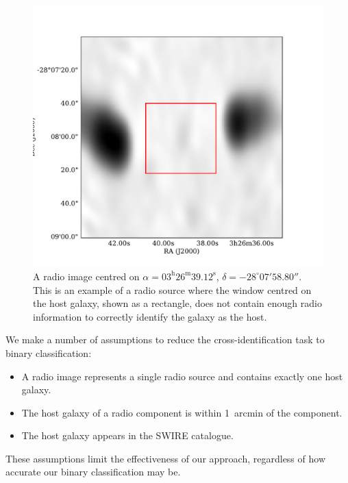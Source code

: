 \documentclass[fleqn,usenatbib,usedcolumn]{mnras}
\begin{document}
        \begin{figure}
      \centering
      \includegraphics[width=\linewidth]{images/CI2363_fig.pdf}
      \caption{A radio image centred on $\alpha =
        03^\text{h}26^\text{m}39.12^\text{s}$, $\delta = -28^\circ{}07'58.80''$.        %
        This is an example of a radio source where the window centred on the
        host galaxy, shown as a rectangle, does not contain enough radio
        information to correctly identify the galaxy as the host.}
      \label{fig:broken-window-size}
    \end{figure}

    We make a number of assumptions to reduce the cross-identification task to binary classification:
    \begin{itemize}
      \item A radio image represents a single radio source and contains exactly
        one host galaxy.
      \item The host galaxy of a radio component is within 1~arcmin of the
        component.
      \item The host galaxy appears in the SWIRE catalogue.
    \end{itemize}
    These assumptions limit the effectiveness of our approach, regardless of
    how accurate our binary classification may be.
\end{document}
